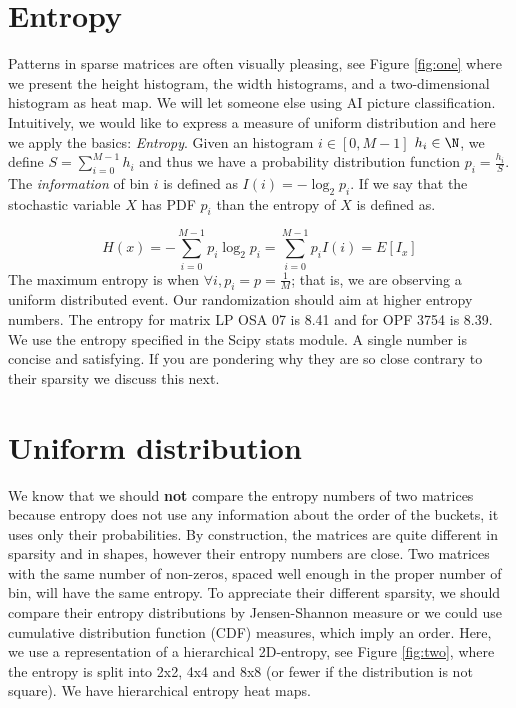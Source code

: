 \documentclass[manuscript,screen]{acmart}
\begin{document}
\section{Entropy}
\label{sec:entropy}
Patterns in sparse matrices are often visually pleasing, see Figure
\ref{fig:one} where we present the height histogram, the width
histograms, and a two-dimensional histogram as heat map. We will let
someone else using AI picture classification. Intuitively, we would
like to express a measure of uniform distribution and here we apply
the basics: {\em Entropy}. Given an histogram $i\in[0,M-1]$ $h_i \in
\N$, we define $S =\sum_{i=0}^{M-1}h_i$ and thus we have a probability
distribution function $p_i = \frac{h_i}{S}$. The {\em information} of
bin $i$ is defined as $I(i) = -\log_2 p_i$. If we say that the
stochastic variable $X$ has PDF $p_i$ than the entropy of $X$ is
defined as.

\begin{equation}
  \label{eq:entropy}
  H(x) = -\sum_{i=0}^{M-1} p_i\log_2p_i = \sum_{i=0}^{M-1}p_i I(i) =
  E[I_x]
\end{equation}
The maximum entropy is when $\forall i, p_i = p = \frac{1}{M}$; that
is, we are observing a uniform distributed event.  Our
randomization should aim at higher entropy numbers. The entropy for
matrix LP OSA 07 is 8.41 and for OPF 3754 is 8.39. We use the entropy
specified in the Scipy stats module.  A single number is concise and
satisfying. If you are pondering why they are so close contrary to
their sparsity we discuss this next.


\section{Uniform distribution}
\label{sec:uniform}
We know that we should {\bf not} compare the entropy numbers of two
matrices because entropy does not use any information about the order
of the buckets, it uses only their probabilities. By construction, the
matrices are quite different in sparsity and in shapes, however their
entropy numbers are close.  Two matrices with the same number of
non-zeros, spaced well enough in the proper number of bin, will have
the same entropy. To appreciate their different sparsity, we should
compare their entropy distributions by Jensen-Shannon measure
\cite{dalberto2012nonparametric} or we could use cumulative
distribution function (CDF) measures, which imply an order. Here, we
use a representation of a hierarchical 2D-entropy, see Figure
\ref{fig:two}, where the entropy is split into 2x2, 4x4 and 8x8 (or
fewer if the distribution is not square). We have hierarchical entropy
heat maps.
\end{document}
